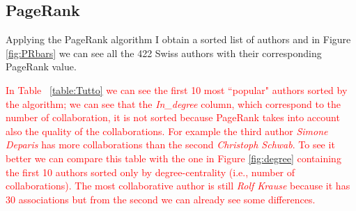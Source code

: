\documentclass[]{usiinfbachelorproject}
\begin{document}
\subsection{PageRank}
Applying the PageRank algorithm I obtain a sorted list of authors and in Figure \ref{fig:PRbars} we can see all the 422 Swiss authors with their corresponding PageRank value. 

\textcolor{red}{In Table ~\ref{table:Tutto} we can see the first 10 most ``popular" authors sorted by the algorithm; we can see that the \textit{In\_degree} column, which correspond to the number of collaboration, it is not sorted because PageRank takes into account also the quality of the collaborations. For example the third author \textit{Simone Deparis} has more collaborations than the second \textit{Christoph Schwab}. To see it better we can compare this table with the one in Figure \ref{fig:degree} containing the first 10 authors sorted only by degree-centrality (i.e., number of collaborations). The most collaborative author is still \textit{Rolf Krause} because it has 30 associations but from the second we can already see some differences.}
\end{document}
